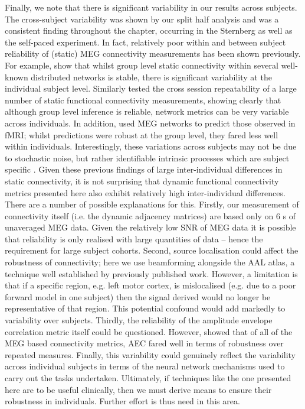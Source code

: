 Finally, we note that there is significant variability in our results across subjects. The cross-subject variability was shown by our split half analysis and was a consistent finding throughout the chapter, occurring in the Sternberg as well as the self-paced experiment. In fact, relatively poor within and between subject reliability of (static) MEG connectivity measurements has been shown previously. For example, \cite{Wens2014a} show that whilst group level static connectivity within several well-known distributed networks is stable, there is significant variability at the individual subject level. Similarly \cite{Colclough2016} tested the cross session repeatability of a large number of static functional connectivity measurements, showing clearly that although group level inference is reliable, network metrics can be very variable across individuals. In addition, \cite{Tewarie2016} used MEG networks to predict those observed in fMRI; whilst predictions were robust at the group level, they fared less well within individuals. Interestingly, these variations across subjects may not be due to stochastic noise, but rather identifiable intrinsic processes which are subject specific \citep{Finn2015}.  Given these previous findings of large inter-individual differences in static connectivity, it is not surprising that dynamic functional connectivity metrics presented here also exhibit relatively high inter-individual differences. There are a number of possible explanations for this. Firstly, our measurement of connectivity itself (i.e. the dynamic adjacency matrices) are based only on 6 s of unaveraged MEG data.  Given the relatively low SNR of MEG data it is possible that reliability is only realised with large quantities of data – hence the requirement for large subject cohorts. Second, source localisation could affect the robustness of connectivity; here we use beamforming alongside the AAL atlas, a technique well established by previously published work. However, a limitation is that if a specific region, e.g. left motor cortex, is mislocalised (e.g. due to a poor forward model in one subject) then the signal derived would no longer be representative of that region. This potential confound would add markedly to variability over subjects. Thirdly, the reliability of the amplitude envelope correlation metric itself could be questioned. However, \cite{Colclough2016} showed that of all of the MEG based connectivity metrics, AEC fared well in terms of robustness over repeated measures. Finally, this variability could genuinely reflect the variability across individual subjects in terms of the neural network mechanisms used to carry out the tasks undertaken. Ultimately, if techniques like the one presented here are to be useful clinically, then we must derive means to ensure their robustness in individuals. Further effort is thus need in this area.


